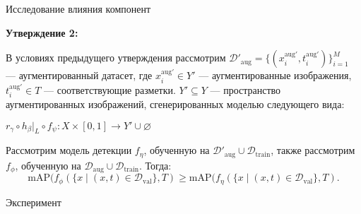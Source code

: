 \documentclass{beamer}
\begin{document}
\begin{frame}{Исследование влияния компонент}

\textbf{Утверждение 2:}\par

В условиях предыдущего утверждения рассмотрим \( \mathcal{D'}_{\text{aug}} = \{(x_i^{\text{aug}'}, t_i^{\text{aug}'})\}_{i=1}^{M} \) — аугментированный датасет, где \( x_i^{\text{aug}'} \in Y'\) — аугментированные изображения, \( t_i^{\text{aug}'} \in T \) — соответствующие разметки. $Y' \subseteq Y$ — пространство аугментированных изображений, сгенерированных моделью следующего вида:

\begin{center}
$ r_{\gamma} \circ h_{\beta}|_{L} \circ f_{\psi}: X \times [0,1] \to Y' \cup \varnothing$
\end{center}


Рассмотрим модель детекции $f_{\eta}$, обученную на $\mathcal{D'}_{\text{aug}} \cup \mathcal{D}_{\text{train}}$, также рассмотрим $f_{\phi}$, обученную на $\mathcal{D}_{\text{aug}} \cup \mathcal{D}_{\text{train}}$. Тогда:
\[
{\text{mAP}}(f_{\phi}(\{ x \mid (x, t) \in  \mathcal{D}_{\text{val}}\}, T) \geq {\text{mAP}}(f_{\eta}(\{ x \mid (x, t) \in  \mathcal{D}_{\text{val}}\}, T).
\]

\end{frame}

\begin{frame}{Эксперимент}

\begin{table}[ht]
\label{tab:map_comparison}
\centering
{}
\caption{Сравнение показателей mAP для модели детекции YOLO, обученной в течение 500 эпох, с порогом фильтрации аугментаций 0.2.}
\end{table}


\end{frame}
\end{document}
